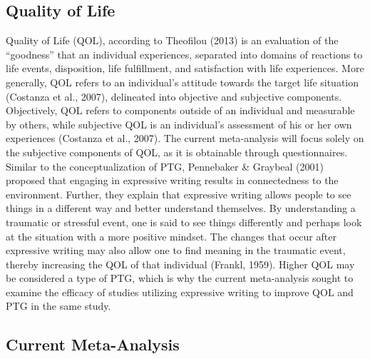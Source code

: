 \documentclass[man]{apa6}
\theoremstyle{definition}
\theoremstyle{definition}
\theoremstyle{definition}
\theoremstyle{remark}
\begin{document}
\subsection{Quality of Life}\label{quality-of-life}

Quality of Life (QOL), according to Theofilou (2013) is an evaluation of
the \enquote{goodness} that an individual experiences, separated into
domains of reactions to life events, disposition, life fulfillment, and
satisfaction with life experiences. More generally, QOL refers to an
individual's attitude towards the target life situation (Costanza et
al., 2007), delineated into objective and subjective components.
Objectively, QOL refers to components outside of an individual and
measurable by others, while subjective QOL is an individual's assessment
of his or her own experiences (Costanza et al., 2007). The current
meta-analysis will focus solely on the subjective components of QOL, as
it is obtainable through questionnaires. Similar to the
conceptualization of PTG, Pennebaker \& Graybeal (2001) proposed that
engaging in expressive writing results in connectedness to the
environment. Further, they explain that expressive writing allows people
to see things in a different way and better understand themselves. By
understanding a traumatic or stressful event, one is said to see things
differently and perhaps look at the situation with a more positive
mindset. The changes that occur after expressive writing may also allow
one to find meaning in the traumatic event, thereby increasing the QOL
of that individual (Frankl, 1959). Higher QOL may be considered a type
of PTG, which is why the current meta-analysis sought to examine the
efficacy of studies utilizing expressive writing to improve QOL and PTG
in the same study.

\subsection{Current Meta-Analysis}\label{current-meta-analysis}
\end{document}
